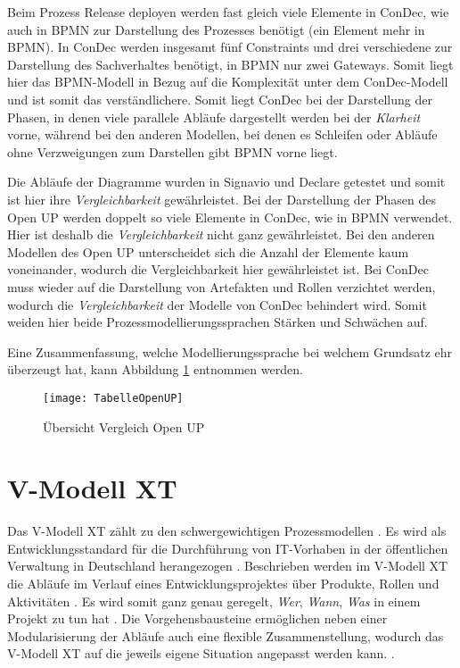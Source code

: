 Beim Prozess Release deployen werden fast gleich viele Elemente in ConDec, wie auch in BPMN zur Darstellung des Prozesses benötigt (ein Element mehr in BPMN). In ConDec werden insgesamt fünf Constraints und drei verschiedene zur Darstellung des Sachverhaltes benötigt, in BPMN nur zwei Gateways. Somit liegt hier das BPMN-Modell in Bezug auf die Komplexität unter dem ConDec-Modell und ist somit das verständlichere.\newline
Somit liegt ConDec bei der Darstellung der Phasen, in denen viele parallele Abläufe dargestellt werden bei der \textit{Klarheit} vorne, während bei den anderen Modellen, bei denen es Schleifen oder Abläufe ohne Verzweigungen zum Darstellen gibt BPMN vorne liegt.\newline

Die Abläufe der Diagramme wurden in Signavio und Declare getestet und somit ist hier ihre \textit{Vergleichbarkeit} gewährleistet.\newline
Bei der Darstellung der Phasen des Open UP werden doppelt so viele Elemente in ConDec, wie in BPMN verwendet. Hier ist deshalb die \textit{Vergleichbarkeit} nicht ganz gewährleistet. Bei den anderen Modellen des Open UP unterscheidet sich die Anzahl der Elemente kaum voneinander, wodurch die Vergleichbarkeit hier gewährleistet ist. \newline
Bei ConDec muss wieder auf die Darstellung von Artefakten und Rollen verzichtet werden, wodurch die \textit{Vergleichbarkeit} der Modelle von ConDec behindert wird. Somit weiden hier beide Prozessmodellierungssprachen Stärken und Schwächen auf.\newline

Eine Zusammenfassung, welche Modellierungssprache bei welchem Grundsatz ehr überzeugt hat, kann Abbildung \ref{fig:TabelleOpenUP} entnommen werden. \newline


\begin{figure}[htp]
\begin{center}
  \texttt{[image: TabelleOpenUP]} %
  \caption{Übersicht Vergleich Open UP}
  \label{fig:TabelleOpenUP}
\end{center}
\end{figure}


\section{V-Modell XT}


Das V-Modell XT zählt zu den schwergewichtigen Prozessmodellen \cite{Hanser2010}. Es wird als Entwicklungsstandard für die Durchführung von IT-Vorhaben in der öffentlichen Verwaltung in Deutschland herangezogen \cite{Kuhrmann2011}. Beschrieben werden im V-Modell XT die Abläufe im Verlauf eines Entwicklungsprojektes über Produkte, Rollen und Aktivitäten \cite{Friedrich2008}. Es wird somit ganz genau geregelt, \textit{Wer}, \textit{Wann}, \textit{Was} in einem Projekt zu tun hat \cite{2004vmodell}. Die Vorgehensbausteine ermöglichen neben einer Modularisierung der Abläufe auch eine flexible Zusammenstellung, wodurch das V-Modell XT auf die jeweils eigene Situation angepasst werden kann. \cite{Friedrich2008,Zoerner2012}. \newline
